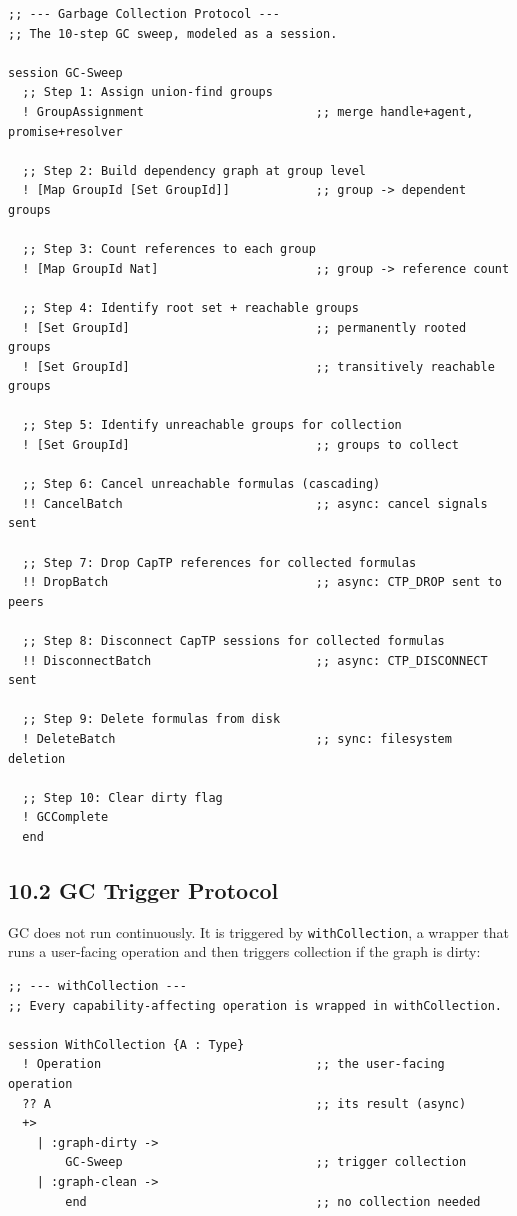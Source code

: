 \documentclass[11pt]{article}
\begin{document}
\begin{verbatim}
;; --- Garbage Collection Protocol ---
;; The 10-step GC sweep, modeled as a session.

session GC-Sweep
  ;; Step 1: Assign union-find groups
  ! GroupAssignment                        ;; merge handle+agent, promise+resolver

  ;; Step 2: Build dependency graph at group level
  ! [Map GroupId [Set GroupId]]            ;; group -> dependent groups

  ;; Step 3: Count references to each group
  ! [Map GroupId Nat]                      ;; group -> reference count

  ;; Step 4: Identify root set + reachable groups
  ! [Set GroupId]                          ;; permanently rooted groups
  ! [Set GroupId]                          ;; transitively reachable groups

  ;; Step 5: Identify unreachable groups for collection
  ! [Set GroupId]                          ;; groups to collect

  ;; Step 6: Cancel unreachable formulas (cascading)
  !! CancelBatch                           ;; async: cancel signals sent

  ;; Step 7: Drop CapTP references for collected formulas
  !! DropBatch                             ;; async: CTP_DROP sent to peers

  ;; Step 8: Disconnect CapTP sessions for collected formulas
  !! DisconnectBatch                       ;; async: CTP_DISCONNECT sent

  ;; Step 9: Delete formulas from disk
  ! DeleteBatch                            ;; sync: filesystem deletion

  ;; Step 10: Clear dirty flag
  ! GCComplete
  end
\end{verbatim}
\subsection{10.2 GC Trigger Protocol}
\label{sec:org1018639}

GC does not run continuously. It is triggered by \texttt{withCollection}, a wrapper
that runs a user-facing operation and then triggers collection if the graph
is dirty:

\begin{verbatim}
;; --- withCollection ---
;; Every capability-affecting operation is wrapped in withCollection.

session WithCollection {A : Type}
  ! Operation                              ;; the user-facing operation
  ?? A                                     ;; its result (async)
  +>
    | :graph-dirty ->
        GC-Sweep                           ;; trigger collection
    | :graph-clean ->
        end                                ;; no collection needed
\end{verbatim}
\end{document}
